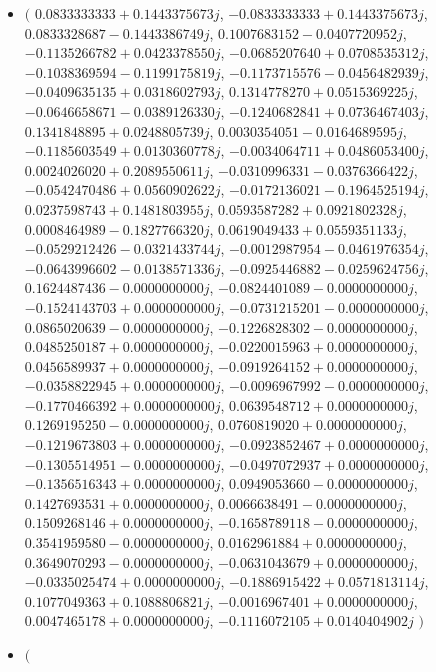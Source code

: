 \documentclass[14pt,a4paper]{article}
\begin{document}
\begin{itemize}
\item
$\big($
$0.0833333333+0.1443375673j$, $-0.0833333333+0.1443375673j$, $0.0833328687-0.1443386749j$, $0.1007683152-0.0407720952j$, $-0.1135266782+0.0423378550j$, $-0.0685207640+0.0708535312j$, $-0.1038369594-0.1199175819j$, $-0.1173715576-0.0456482939j$, $-0.0409635135+0.0318602793j$, $0.1314778270+0.0515369225j$, $-0.0646658671-0.0389126330j$, $-0.1240682841+0.0736467403j$, $0.1341848895+0.0248805739j$, $0.0030354051-0.0164689595j$, $-0.1185603549+0.0130360778j$, $-0.0034064711+0.0486053400j$, $0.0024026020+0.2089550611j$, $-0.0310996331-0.0376366422j$, $-0.0542470486+0.0560902622j$, $-0.0172136021-0.1964525194j$, $0.0237598743+0.1481803955j$, $0.0593587282+0.0921802328j$, $0.0008464989-0.1827766320j$, $0.0619049433+0.0559351133j$, $-0.0529212426-0.0321433744j$, $-0.0012987954-0.0461976354j$, $-0.0643996602-0.0138571336j$, $-0.0925446882-0.0259624756j$, $0.1624487436-0.0000000000j$, $-0.0824401089-0.0000000000j$, $-0.1524143703+0.0000000000j$, $-0.0731215201-0.0000000000j$, $0.0865020639-0.0000000000j$, $-0.1226828302-0.0000000000j$, $0.0485250187+0.0000000000j$, $-0.0220015963+0.0000000000j$, $0.0456589937+0.0000000000j$, $-0.0919264152+0.0000000000j$, $-0.0358822945+0.0000000000j$, $-0.0096967992-0.0000000000j$, $-0.1770466392+0.0000000000j$, $0.0639548712+0.0000000000j$, $0.1269195250-0.0000000000j$, $0.0760819020+0.0000000000j$, $-0.1219673803+0.0000000000j$, $-0.0923852467+0.0000000000j$, $-0.1305514951-0.0000000000j$, $-0.0497072937+0.0000000000j$, $-0.1356516343+0.0000000000j$, $0.0949053660-0.0000000000j$, $0.1427693531+0.0000000000j$, $0.0066638491-0.0000000000j$, $0.1509268146+0.0000000000j$, $-0.1658789118-0.0000000000j$, $0.3541959580-0.0000000000j$, $0.0162961884+0.0000000000j$, $0.3649070293-0.0000000000j$, $-0.0631043679+0.0000000000j$, $-0.0335025474+0.0000000000j$, $-0.1886915422+0.0571813114j$, $0.1077049363+0.1088806821j$, $-0.0016967401+0.0000000000j$, $0.0047465178+0.0000000000j$, $-0.1116072105+0.0140404902j$
$\big)$
\item
$\big($

\end{itemize}
\end{document}
